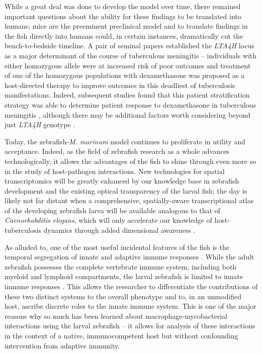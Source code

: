 While a great deal was done to develop the model over time, there remained important questions about the ability for these findings to be translated into humans; mice are the preeminent preclinical model and to translate findings in the fish directly into humans could, in certain instances, dramatically cut the bench\hyp{}to\hyp{}bedside timeline. A pair of seminal papers \citep{Tobin2010, Tobin2012} established the \textit{LTA4H} locus as a major determinant of the course of tuberculous meningitis -- individuals with either homozygous allele were at increased risk of poor outcomes and treatment of one of the homozygous populations with dexamethasone was proposed as a host\hyp{}directed therapy to improve outcomes in this deadliest of tuberculosis manifestations. Indeed, subsequent studies found that this patient stratification strategy was able to determine patient response to dexamethasone in tuberculous meningitis \citep{Thuong2017, Thwaites2013, Wilkinson2017, Davis2018, Prasad2016}, although there may be additional factors worth considering beyond just \textit{LTA4H} genotype \citep{Siddiqi2021}.

Today, the zebrafish\hyp{}\textit{M. marinum} model continues to proliferate in utility and acceptance. Indeed, as the field of zebrafish research as a whole advances technologically, it allows the advantages of the fish to shine through even more so in the study of host\hyp{}pathogen interactions. New technologies for spatial transcriptomics will be greatly enhanced by our knowledge base in zebrafish development and the existing optical transparency of the larval fish; the day is likely not far distant when a comprehensive, spatially\hyp{}aware transcriptional atlas of the developing zebrafish larva will be available analogous to that of \textit{Caenorhabditis elegans}, which will only accelerate our knowledge of host\hyp{}tuberculosis dynamics through added dimensional awareness \citep{Packer2019}.

As alluded to, one of the most useful incidental features of the fish is the temporal segregation of innate and adaptive immune responses \citep{Myllymaki2016}. While the adult zebrafish possesses the complete vertebrate immune system, including both myeloid and lymphoid compartments, the larval zebrafish is limited to innate immune responses \citep{Cronan2014}. This allows the researcher to differentiate the contributions of these two distinct systems to the overall phenotype and to, in an unmodified host, ascribe discrete roles to the innate immune system. This is one of the major reasons why so much has been learned about macrophage\hyp{}mycobacterial interactions using the larval zebrafish -- it allows for analysis of these interactions in the context of a native, immunocompetent host but without confounding intervention from adaptive immunity.

